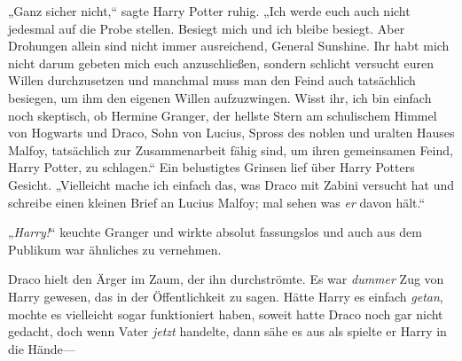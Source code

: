 „Ganz sicher nicht,“ sagte Harry Potter ruhig. „Ich werde euch auch nicht jedesmal auf die Probe stellen. Besiegt mich und ich bleibe besiegt. Aber Drohungen allein sind nicht immer ausreichend, General Sunshine. Ihr habt mich nicht darum gebeten mich euch anzuschließen, sondern schlicht versucht euren Willen durchzusetzen und manchmal muss man den Feind auch tatsächlich besiegen, um ihm den eigenen Willen aufzuzwingen. Wisst ihr, ich bin einfach noch skeptisch, ob Hermine Granger, der hellste Stern am schulischem Himmel von Hogwarts und Draco, Sohn von Lucius, Spross des noblen und uralten Hauses Malfoy, tatsächlich zur Zusammenarbeit fähig sind, um ihren gemeinsamen Feind, Harry Potter, zu schlagen.“ Ein belustigtes Grinsen lief über Harry Potters Gesicht. „Vielleicht mache ich einfach das, was Draco mit Zabini versucht hat und schreibe einen kleinen Brief an Lucius Malfoy; mal sehen was \emph{er} davon hält.“

„\emph{Harry!}“ keuchte Granger und wirkte absolut fassungslos und auch aus dem Publikum war ähnliches zu vernehmen.

Draco hielt den Ärger im Zaum, der ihn durchströmte. Es war \emph{dummer} Zug von Harry gewesen, das in der Öffentlichkeit zu sagen. Hätte Harry es einfach \emph{getan}, mochte es vielleicht sogar funktioniert haben, soweit hatte Draco noch gar nicht gedacht, doch wenn Vater \emph{jetzt} handelte, dann sähe es aus als spielte er Harry in die Hände—

